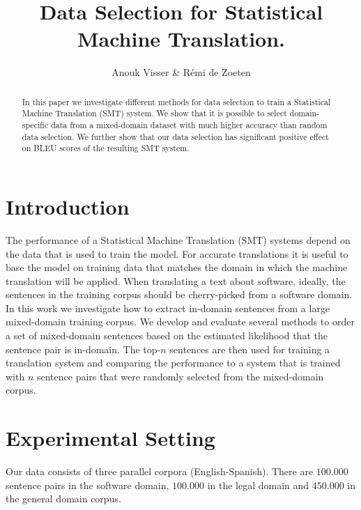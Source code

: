 \documentclass[11pt]{article}
\title{Data Selection for Statistical Machine Translation.}
\author{Anouk Visser \& R\'emi de Zoeten}
\date{}
\begin{document}
\maketitle

\begin{abstract}
In this paper we investigate different methods for data selection to train a Statistical Machine Translation (SMT) system. We show that it is possible to select domain-specific data from a mixed-domain dataset with much higher accuracy than random data selection. We further show that our data selection has significant positive effect on BLEU scores of the resulting SMT system.
\end{abstract}

\section{Introduction}
\label{sec:intro}
The performance of a Statistical Machine Translation (SMT) systems depend on the data that is used to train the model. For accurate translations it is useful to base the model on training data that matches the domain in which the machine translation will be applied. When translating a text about software, ideally, the sentences in the training corpus should be cherry-picked from a software domain. 
In this work we investigate how to extract in-domain sentences from a large mixed-domain training corpus. We develop and evaluate several methods to order a set of mixed-domain sentences based on the estimated likelihood that the sentence pair is in-domain. The top-$n$ sentences are then used for training a translation system and comparing the performance to a system that is trained with $n$ sentence pairs that were randomly selected from the mixed-domain corpus.

\section{Experimental Setting}
Our data consists of three parallel corpora (English-Spanish). There are $100.000$ sentence pairs in the software domain, $100.000$ in the legal domain and $450.000$ in the general domain corpus. 
\end{document}
